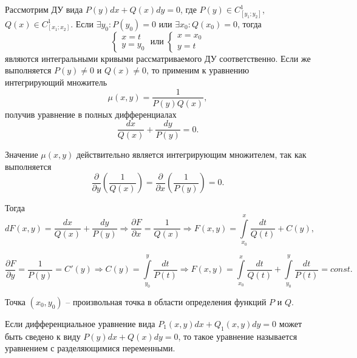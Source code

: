 Рассмотрим ДУ вида $P(y)dx + Q(x)dy = 0$, где $P(y) \in C_{[y_1; y_2]}^1$, $Q(x) \in C_{[x_1; x_2]}^1$. Если $\exists y_0: P(y_0) = 0$ или  $\exists x_0: Q(x_0) = 0$, тогда
\begin{equation}
    \begin{cases}
        x = t \\ 
        y = y_0
    \end{cases} \;
    \text{или} \;
    \begin{cases}
        x = x_0 \\ 
        y = t
    \end{cases}
\end{equation}
являются интегральными кривыми рассматриваемого ДУ соответственно. Если же выполняется $P(y) \neq 0$ и $Q(x) \neq 0$, то применим к уравнению интегрирующий множитель
\[ \mu(x, y) = \frac{1}{P(y)Q(x)}, \]
получив уравнение в полных дифференциалах
\begin{equation}
    \frac{dx}{Q(x)} + \frac{dy}{P(y)} = 0.
\end{equation}

Значение $\mu(x, y)$ действительно является интегрирующим множителем, так как выполняется
\begin{equation}
    \frac{\partial}{\partial y} \left( \frac{1}{Q(x)} \right) =  \frac{\partial}{\partial x} \left( \frac{1}{P(y)} \right) = 0.
\end{equation}

Тогда
\begin{equation}
    dF(x, y) = \frac{dx}{Q(x)} + \frac{dy}{P(y)} \Rightarrow \frac{\partial F}{\partial x} = \frac{1}{Q(x)} \Rightarrow F(x, y) = \int\limits_{x_0}^{x} \frac{dt}{Q(t)} + C(y),
\end{equation}

\begin{equation}
    \frac{\partial F}{\partial y} = \frac{1}{P(y)} = C'(y) \Rightarrow C(y) = \int\limits_{y_0}^{y} \frac{dt}{P(t)} \Rightarrow F(x, y) = \int\limits_{x_0}^{x} \frac{dt}{Q(t)} + \int\limits_{y_0}^{y} \frac{dt}{P(t)} = const.
\end{equation}

Точка $(x_0, y_0)$ -- произвольная точка в области определения функций $P$ и $Q$.

\begin{definition}
    Если дифференциальное уравнение вида $P_1(x, y)dx + Q_1(x, y)dy = 0$ может быть сведено к виду $P(y)dx + Q(x)dy = 0$, то такое уравнение называется уравнением с разделяющимися переменными.
\end{definition}

